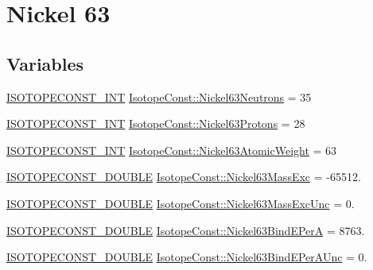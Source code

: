 \hypertarget{group___isotope_const-_nickel-_ni63}{}\section{Nickel 63}
\label{group___isotope_const-_nickel-_ni63}
\subsection*{Variables}
\begin{DoxyCompactItemize}
\item 
\mbox{\hyperlink{group___isotope_const-_macros_ga5f18360b3e99483a35c32d789e62621c}{I\+S\+O\+T\+O\+P\+E\+C\+O\+N\+S\+T\+\_\+\+I\+NT}} \mbox{\hyperlink{group___isotope_const-_nickel-_ni63_ga67b646bb2aefea1d64b6129e22d10185}{Isotope\+Const\+::\+Nickel63\+Neutrons}} = 35
\item 
\mbox{\hyperlink{group___isotope_const-_macros_ga5f18360b3e99483a35c32d789e62621c}{I\+S\+O\+T\+O\+P\+E\+C\+O\+N\+S\+T\+\_\+\+I\+NT}} \mbox{\hyperlink{group___isotope_const-_nickel-_ni63_gab1f59554c6ed550cc1470be1d473f396}{Isotope\+Const\+::\+Nickel63\+Protons}} = 28
\item 
\mbox{\hyperlink{group___isotope_const-_macros_ga5f18360b3e99483a35c32d789e62621c}{I\+S\+O\+T\+O\+P\+E\+C\+O\+N\+S\+T\+\_\+\+I\+NT}} \mbox{\hyperlink{group___isotope_const-_nickel-_ni63_gac0ffc6936a079a6b1ced0f12f3fa5f6a}{Isotope\+Const\+::\+Nickel63\+Atomic\+Weight}} = 63
\item 
\mbox{\hyperlink{group___isotope_const-_macros_ga8f45a7272ce02c0b4c65c44636ed719a}{I\+S\+O\+T\+O\+P\+E\+C\+O\+N\+S\+T\+\_\+\+D\+O\+U\+B\+LE}} \mbox{\hyperlink{group___isotope_const-_nickel-_ni63_gafe7d9155c1324854494c017568b54560}{Isotope\+Const\+::\+Nickel63\+Mass\+Exc}} = -\/65512.
\item 
\mbox{\hyperlink{group___isotope_const-_macros_ga8f45a7272ce02c0b4c65c44636ed719a}{I\+S\+O\+T\+O\+P\+E\+C\+O\+N\+S\+T\+\_\+\+D\+O\+U\+B\+LE}} \mbox{\hyperlink{group___isotope_const-_nickel-_ni63_ga119953a81363ed10f445c609b69e5c4e}{Isotope\+Const\+::\+Nickel63\+Mass\+Exc\+Unc}} = 0.
\item 
\mbox{\hyperlink{group___isotope_const-_macros_ga8f45a7272ce02c0b4c65c44636ed719a}{I\+S\+O\+T\+O\+P\+E\+C\+O\+N\+S\+T\+\_\+\+D\+O\+U\+B\+LE}} \mbox{\hyperlink{group___isotope_const-_nickel-_ni63_gada87a4f274bcb7a3944d90b853775141}{Isotope\+Const\+::\+Nickel63\+Bind\+E\+PerA}} = 8763.
\item 
\mbox{\hyperlink{group___isotope_const-_macros_ga8f45a7272ce02c0b4c65c44636ed719a}{I\+S\+O\+T\+O\+P\+E\+C\+O\+N\+S\+T\+\_\+\+D\+O\+U\+B\+LE}} \mbox{\hyperlink{group___isotope_const-_nickel-_ni63_ga3ef994d33f60f205b8c4ed4b515f77f7}{Isotope\+Const\+::\+Nickel63\+Bind\+E\+Per\+A\+Unc}} = 0.

\end{DoxyCompactItemize}
